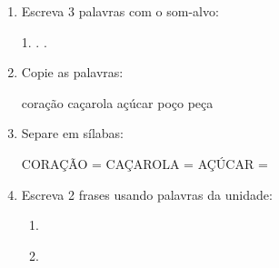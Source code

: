 \begin{exercicio}
\begin{enumerate}[resume]
  \item Escreva 3 palavras com o som-alvo:
  \begin{center}
  1. \underline{\hspace{3cm}} . \underline{\hspace{3cm}} . \underline{\hspace{3cm}}
  \end{center}

  \item Copie as palavras:
  \begin{center}
  coração \quad caçarola \quad açúcar \quad poço \quad peça
  \end{center}

  \item Separe em sílabas:
  \begin{center}
  CORAÇÃO = \underline{\hspace{1cm}} \underline{\hspace{1cm}} \quad CAÇAROLA = \underline{\hspace{1cm}} \underline{\hspace{1cm}} \quad AÇÚCAR = \underline{\hspace{1cm}} \underline{\hspace{1cm}}
  \end{center}

  \item Escreva 2 frases usando palavras da unidade:
  \begin{enumerate}[label=\alph*)]
    \item \underline{\hspace{8cm}}
    \item \underline{\hspace{8cm}}
  \end{enumerate}

\end{enumerate}

\end{exercicio}




